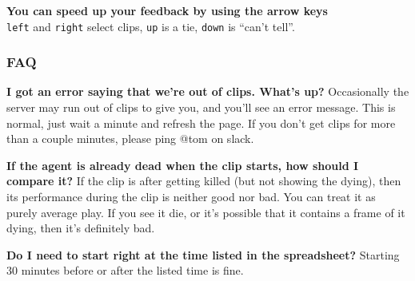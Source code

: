 \documentclass{article}
\begin{document}
\textbf{You can speed up your feedback by using the arrow keys} \\
\texttt{left} and \texttt{right} select clips, \texttt{up} is a tie, \texttt{down} is ``can't tell''.


\subsubsection*{FAQ}

\textbf{I got an error saying that we’re out of clips. What’s up?}
Occasionally the server may run out of clips to give you, and you'll see an error message.
This is normal, just wait a minute and refresh the page.
If you don't get clips for more than a couple minutes, please ping @tom on slack.

\textbf{If the agent is already dead when the clip starts, how should I compare it?}
If the clip is after getting killed (but not showing the dying),
then its performance during the clip is neither good nor bad.
You can treat it as purely average play.
If you see it die, or it’s possible that it contains a frame of it dying, then it’s definitely bad.

\textbf{Do I need to start right at the time listed in the spreadsheet?}
Starting 30 minutes before or after the listed time is fine.
\end{document}
